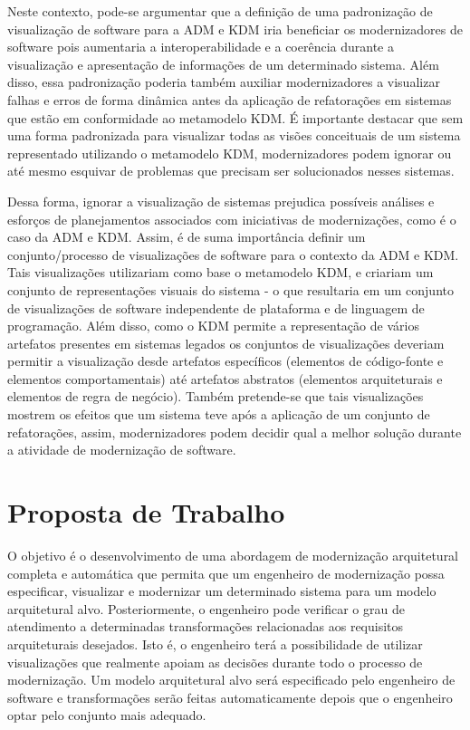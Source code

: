 \documentclass[12pt]{article}
\begin{document}
Neste contexto, pode-se argumentar que a definição de uma padronização de visualização de software para a ADM e KDM iria beneficiar os modernizadores de software pois aumentaria a interoperabilidade e a coerência durante a visualização e apresentação de informações de um determinado sistema. Além disso, essa padronização poderia também auxiliar modernizadores a visualizar falhas e erros  de forma dinâmica antes da aplicação de refatorações em sistemas que estão em conformidade ao metamodelo KDM. É importante destacar que sem uma forma padronizada para visualizar todas as visões conceituais de um sistema representado utilizando o metamodelo KDM, modernizadores podem ignorar ou até mesmo esquivar de problemas que precisam ser solucionados nesses sistemas. 

Dessa forma, ignorar a visualização de sistemas prejudica possíveis análises e esforços de planejamentos associados com iniciativas de modernizações, como é o caso da ADM e KDM. Assim, é de suma importância definir um conjunto/processo de visualizações de software para o contexto da ADM e KDM. Tais visualizações utilizariam como base o metamodelo KDM, e criariam um conjunto de representações visuais do sistema - o que resultaria em um conjunto de visualizações de software independente de plataforma e de linguagem de programação. Além disso, como o KDM permite a representação de vários artefatos presentes em sistemas legados os conjuntos de visualizações deveriam permitir a visualização desde artefatos específicos (elementos de código-fonte e elementos comportamentais) até artefatos abstratos (elementos arquiteturais e elementos de regra de negócio). Também pretende-se que tais visualizações mostrem os efeitos que um sistema teve após a aplicação de um conjunto de refatorações, assim, modernizadores podem decidir qual a melhor solução durante a atividade de modernização de software.

\section{Proposta de Trabalho}\label{sec:proposta_de_trabalho}

O objetivo é o desenvolvimento de uma abordagem de modernização arquitetural completa e automática que permita que um engenheiro de modernização possa especificar, visualizar e modernizar um determinado sistema para um modelo arquitetural alvo. Posteriormente, o engenheiro pode verificar o grau de atendimento a determinadas transformações relacionadas aos requisitos arquiteturais desejados. Isto é, o engenheiro terá a possibilidade de utilizar visualizações que realmente apoiam as decisões durante todo o processo de modernização. Um modelo arquitetural alvo será especificado pelo engenheiro de software e transformações serão feitas automaticamente depois que o engenheiro optar pelo conjunto mais adequado.
\end{document}
